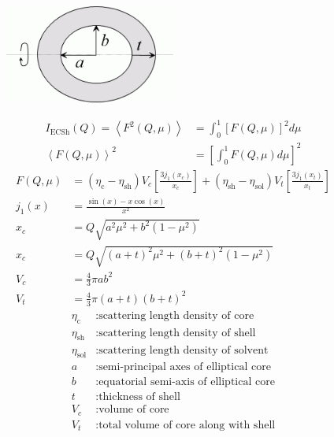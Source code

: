 \begin{figure}[htb]
\begin{center}
\includegraphics[width=0.5\textwidth,height=0.28855\textwidth]{ellipsoidalShell.png}
\end{center}
\caption{} \label{ellipsoidalShell}
\end{figure}
\begin{align}
I_\text{ECSh}(Q) = \left\langle F^2(Q,\mu) \right\rangle
& = \int_0^1 \left[F(Q,\mu)\right]^2 d\mu \\
\left\langle F(Q,\mu) \right\rangle^2 & = \left[\int_0^1 F(Q,\mu)
d\mu \right]^2
\end{align}
\begin{align}
F(Q,\mu) &= \left(\eta_\text{c}-\eta_\text{sh}\right) V_c\left[
\frac{3j_1(x_c)}{x_c}\right]
          +\left(\eta_\text{sh}-\eta_\text{sol}\right) V_t\left[ \frac{3j_1(x_t)}{x_t}\right]
          \nonumber \\
j_1(x) &= \frac{\sin(x)-x\cos(x)}{x^2} \nonumber \\
x_c &= Q \sqrt{a^2\mu^2+b^2(1-\mu^2)} \nonumber \\
x_c &= Q \sqrt{(a+t)^2\mu^2+(b+t)^2(1-\mu^2)} \nonumber \\
V_c &= \frac{4}{3}\pi ab^2 \nonumber \\
V_t &= \frac{4}{3}\pi (a+t)(b+t)^2 \nonumber
\end{align}
\begin{align}
\eta_\text{c} &: \text{scattering length density of core} \nonumber \\
\eta_\text{sh} &: \text{scattering length density of shell} \nonumber \\
\eta_\text{sol} &: \text{scattering length density of solvent} \nonumber \\
a &: \text{semi-principal axes of elliptical core} \nonumber \\
b &: \text{equatorial semi-axis of elliptical core} \nonumber \\
t &: \text{thickness of shell} \nonumber \\
V_c &: \text{volume of core} \nonumber \\
V_t &: \text{total volume of core along with shell} \nonumber
\end{align}

